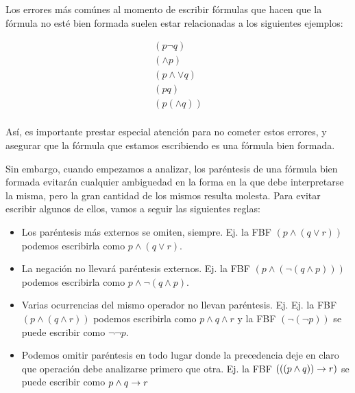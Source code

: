Los errores más comúnes al momento de escribir fórmulas que hacen que la fórmula
no esté bien formada suelen estar relacionadas a los siguientes ejemplos:

\begin{align}
    (p \lnot q) \tag*{Usar la negación como operador binario, en lugar de operador unario.}\\
    (\land p) \tag*{Usar un operador binario como un operador unario.}\\
    (p \land \lor q) \tag*{Usar dos operadores binarios de forma consecutiva}\\
    (p q) \tag*{Ausencia de operador entre dos variables proposicionales o fórmulas}\\
    (p (\land q)) \tag*{Aperturas o cierres de paréntesis en lugares incorrectos}\\
\end{align}


Así, es importante prestar especial atención para no cometer estos errores, y
asegurar que la fórmula que estamos escribiendo es una fórmula bien formada.

Sin embargo, cuando empezamos a analizar, los paréntesis de una fórmula bien
formada evitarán cualquier ambiguedad en la forma en la que debe interpretarse
la misma, pero la gran cantidad de los mismos resulta molesta. Para evitar
escribir algunos de ellos, vamos a seguir las siguientes reglas:

\begin{itemize}
    \item Los paréntesis más externos se omiten, siempre. Ej. la FBF \textit{$(p
    \land (q \lor r))$} podemos escribirla como \textit{$p \land (q \lor r)$}.
    \item La negación no llevará paréntesis externos. Ej. la FBF \textit{$(p
    \land (\lnot (q \land p)))$} podemos escribirla como \textit{$p \land \lnot
    (q \land p)$}.
    \item Varias ocurrencias del mismo operador no llevan paréntesis. Ej. Ej. la
    FBF \textit{$(p \land (q \land r))$} podemos escribirla como \textit{$p
    \land q \land r$} y la FBF \textit{$(\lnot (\lnot p))$} se puede escribir
    como \textit{$\lnot \lnot p$}.
    \item Podemos omitir paréntesis en todo lugar donde la precedencia deje en
    claro que operación debe analizarse primero que otra. Ej. la FBF
    \textit{$(((p \land q)) \to r)$} se puede escribir como \textit{$p \land
    q \to r$}
\end{itemize}

